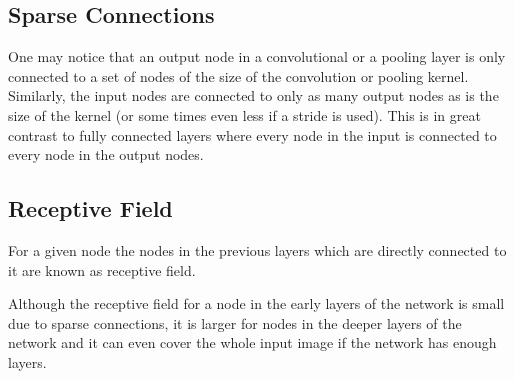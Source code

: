 \documentclass[]{article}
\begin{document}
\subsection{Sparse Connections}
One may notice that an output node in a convolutional or a pooling layer is only
connected to a set of nodes of the size of the convolution or pooling kernel.
Similarly, the input nodes are connected to only as many output nodes as is the size
of the kernel (or some times even less if a stride is used). This is in great contrast
to fully connected layers where every node in the input is connected to every node
in the output nodes.


\subsection{Receptive Field}
For a given node the nodes in the previous layers which are directly connected
to it are known as receptive field.

Although the receptive field for a node in the early layers of the network is small
due to sparse connections, it is larger for nodes in the deeper layers of the network
and it can even cover the whole input image if the network has enough layers.
\end{document}

